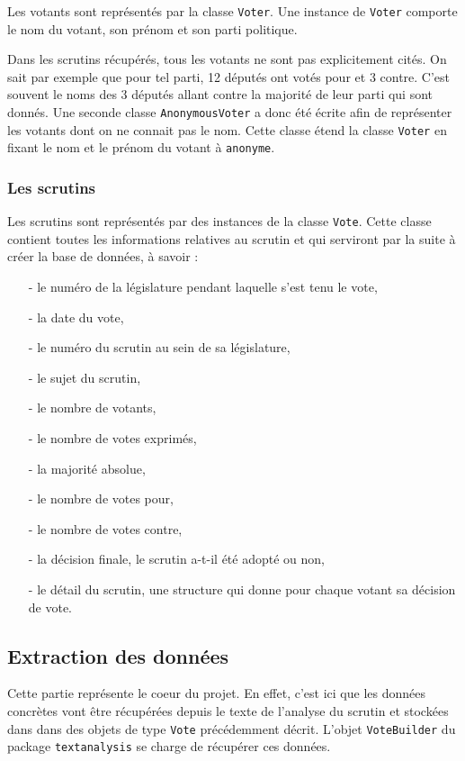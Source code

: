 Les votants sont représentés par la classe \verb|Voter|. Une instance de \verb|Voter| comporte le nom du votant, son prénom et son parti politique.

Dans les scrutins récupérés, tous les votants ne sont pas explicitement cités. On sait par exemple que pour tel parti, 12 députés ont votés pour et 3 contre. C'est souvent le noms des 3 députés allant contre la majorité de leur parti qui sont donnés. Une seconde classe \verb|AnonymousVoter| a donc été écrite afin de représenter les votants dont on ne connait pas le nom. Cette classe étend la classe \verb|Voter| en fixant le nom et le prénom du votant à \verb|anonyme|.

\subsubsection*{Les scrutins}

Les scrutins sont représentés par des instances de la classe \verb|Vote|. Cette classe contient toutes les informations relatives au scrutin et qui serviront par la suite à créer la base de données, à savoir :
\begin{itemize}
\item[-] le numéro de la législature pendant laquelle s'est tenu le vote,
\item[-] la date du vote,
\item[-] le numéro du scrutin au sein de sa législature,
\item[-] le sujet du scrutin,
\item[-] le nombre de votants,
\item[-] le nombre de votes exprimés,
\item[-] la majorité absolue,
\item[-] le nombre de votes pour,
\item[-] le nombre de votes contre,
\item[-] la décision finale, le scrutin a-t-il été adopté ou non,
\item[-] le détail du scrutin, une structure qui donne pour chaque votant sa décision de vote.
\end{itemize}

\subsection{Extraction des données}

Cette partie représente le coeur du projet. En effet, c'est ici que les données concrètes vont être récupérées depuis le texte de l'analyse du scrutin et stockées dans dans des objets de type \verb|Vote| précédemment décrit. L'objet \verb|VoteBuilder| du package \verb|textanalysis| se charge de récupérer ces données.

